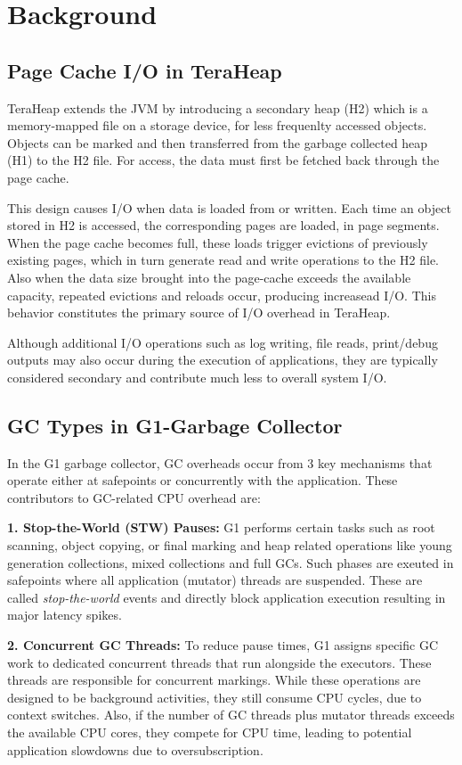 \section{Background}


\subsection{Page Cache I/O in TeraHeap}


TeraHeap extends the JVM by introducing a secondary heap (H2) which is a memory-mapped file
on a storage device, for less frequenlty accessed objects.
Objects can be marked and then transferred from the garbage collected heap (H1) to the H2 file.
For access, the data must first be fetched back through the page cache.

This design causes I/O when data is loaded from or written. Each time an object stored in H2 is
accessed, the corresponding pages are loaded, in page segments. When the page cache becomes full,
these loads trigger evictions of previously existing pages, which in turn
generate read and write operations to the H2 file. Also when the data size 
brought into the page-cache exceeds the available capacity, repeated evictions
and reloads occur, producing increasead I/O. This behavior constitutes the
primary source of I/O overhead in TeraHeap.

Although additional I/O operations such as log writing, file reads, print/debug
outputs may also occur during the execution of applications, they are typically
considered secondary and contribute much less to overall system I/O.

\subsection{GC Types in G1-Garbage Collector}
In the G1 garbage collector, GC overheads occur from 3 key
mechanisms that operate either at safepoints or concurrently with the application.
These contributors to GC-related CPU overhead are:

\textbf{1. Stop-the-World (STW) Pauses:}  
G1 performs certain tasks such as root scanning, object copying, or final marking and heap related operations
like young generation collections, mixed collections and full GCs. Such phases are exeuted in safepoints
where all application (mutator) threads are suspended. These are called \emph{stop-the-world} events and
directly block application execution resulting in major latency spikes.

\textbf{2. Concurrent GC Threads:}  
To reduce pause times, G1 assigns specific GC work to dedicated concurrent threads that run 
alongside the executors. These threads are responsible for concurrent markings.
While these operations are designed to be background activities,
they still consume CPU cycles, due to context switches. Also, if the number of GC threads plus mutator threads exceeds the available 
CPU cores, they compete for CPU time, leading to potential application slowdowns due to oversubscription.

